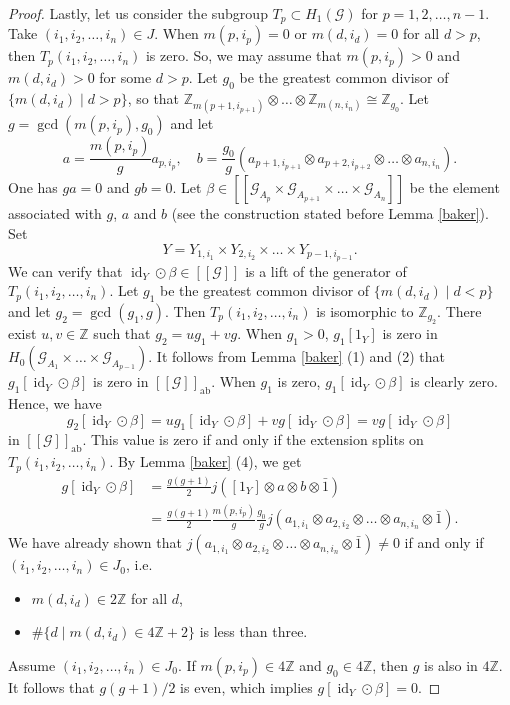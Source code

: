 \documentclass[11pt]{article}
\theoremstyle{definition}
\numberwithin{equation}{section}
\newcommand{\id}{\operatorname{id}}
\newcommand{\ab}{\mathrm{ab}}
\newcommand{\G}{\mathcal{G}}
\newcommand{\Z}{\mathbb{Z}}
\begin{document}
\begin{proof}
Lastly, 
let us consider the subgroup $T_p\subset H_1(\G)$ for $p=1,2,\dots,n{-}1$. 
Take $(i_1,i_2,\dots,i_n)\in J$. 
When $m(p,i_p)=0$ or $m(d,i_d)=0$ for all $d>p$, then 
$T_p(i_1,i_2,\dots,i_n)$ is zero. 
So, we may assume that $m(p,i_p)>0$ and $m(d,i_d)>0$ for some $d>p$. 
Let $g_0$ be the greatest common divisor of $\{m(d,i_d)\mid d>p\}$, 
so that $\Z_{m(p+1,i_{p+1})}\otimes\dots\otimes\Z_{m(n,i_n)}\cong\Z_{g_0}$. 
Let $g=\gcd(m(p,i_p),g_0)$ and let 
\[
a=\frac{m(p,i_p)}{g}a_{p,i_p},\quad 
b=\frac{g_0}{g}(a_{p+1,i_{p+1}}\otimes a_{p+2,i_{p+2}}\otimes\dots
\otimes a_{n,i_n}). 
\]
One has $ga=0$ and $gb=0$. 
Let $\beta\in[[\G_{A_p}\times\G_{A_{p+1}}\times\dots\times\G_{A_n}]]$ be 
the element associated with $g$, $a$ and $b$ 
(see the construction stated before Lemma \ref{baker}). 
Set 
\[
Y=Y_{1,i_1}\times Y_{2,i_2}\times\dots\times Y_{p-1,i_{p-1}}. 
\]
We can verify that $\id_Y\odot\beta\in[[\G]]$ is 
a lift of the generator of $T_p(i_1,i_2,\dots,i_n)$. 
Let $g_1$ be the greatest common divisor of $\{m(d,i_d)\mid d<p\}$ and 
let $g_2=\gcd(g_1,g)$. 
Then $T_p(i_1,i_2,\dots,i_n)$ is isomorphic to $\Z_{g_2}$. 
There exist $u,v\in\Z$ such that $g_2=ug_1+vg$. 
When $g_1>0$, 
$g_1[1_Y]$ is zero in $H_0(\G_{A_1}\times\dots\times\G_{A_{p-1}})$. 
It follows from Lemma \ref{baker} (1) and (2) that 
$g_1[\id_Y\odot\beta]$ is zero in $[[\G]]_\ab$. 
When $g_1$ is zero, $g_1[\id_Y\odot\beta]$ is clearly zero. 
Hence, we have 
\[
g_2[\id_Y\odot\beta]=ug_1[\id_Y\odot\beta]+vg[\id_Y\odot\beta]
=vg[\id_Y\odot\beta]
\]
in $[[\G]]_\ab$. 
This value is zero if and only if 
the extension splits on $T_p(i_1,i_2,\dots,i_n)$. 
By Lemma \ref{baker} (4), we get 
\begin{align*}
g[\id_Y\odot\beta]&=\frac{g(g+1)}{2}j([1_Y]\otimes a\otimes b\otimes\bar{1})\\
&=\frac{g(g+1)}{2}\frac{m(p,i_p)}{g}\frac{g_0}{g}
j(a_{1,i_1}\otimes a_{2,i_2}\otimes\dots\otimes a_{n,i_n}\otimes\bar{1}). 
\end{align*}
We have already shown that 
$j(a_{1,i_1}\otimes a_{2,i_2}\otimes\dots\otimes a_{n,i_n}\otimes\bar{1})
\neq0$ 
if and only if $(i_1,i_2,\dots,i_n)\in J_0$, i.e. 
\begin{itemize}
\item $m(d,i_d)\in2\Z$ for all $d$, 
\item $\#\{d\mid m(d,i_d)\in4\Z{+}2\}$ is less than three. 
\end{itemize}
Assume $(i_1,i_2,\dots,i_n)\in J_0$. 
If $m(p,i_p)\in4\Z$ and $g_0\in4\Z$, then $g$ is also in $4\Z$. 
It follows that $g(g+1)/2$ is even, which implies $g[\id_Y\odot\beta]=0$. 

\end{proof}
\end{document}

